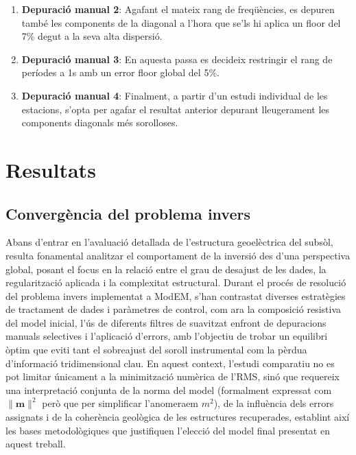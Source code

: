 \documentclass[11pt,a4paper,oneside]{article}
\begin{document}
\begin{enumerate}
    
    \item \textbf{Depuració manual 2}: Agafant el mateix rang de freqüències, es depuren també les components de la diagonal a l'hora que se'ls hi aplica un floor del 7\% degut a la seva alta dispersió.
    
    \item \textbf{Depuració manual 3}: En aquesta passa es decideix restringir el rang de períodes a 1s amb un error floor global del 5\%.

    \item \textbf{Depuració manual 4}: Finalment, a partir d'un estudi individual de les estacions, s'opta per agafar el resultat anterior depurant lleugerament les components diagonals més sorolloses.    

\end{enumerate} 


\section{Resultats}

\subsection{Convergència del problema invers}


Abans d'entrar en l'avaluació detallada de l'estructura geoelèctrica del subsòl,
resulta fonamental analitzar el comportament de la inversió des d'una perspectiva
global, posant el focus en la relació entre el grau de desajust de les dades, la
regularització aplicada i la complexitat estructural.
Durant el procés de resolució del problema invers
implementat a ModEM, s'han contrastat diverses estratègies de tractament de dades i
paràmetres de control, com ara la composició resistiva del model inicial, l'ús de diferents filtres de suavitzat enfront de
depuracions manuals selectives i l'aplicació d'errors, amb l'objectiu de trobar un equilibri òptim que eviti
tant el sobreajust del soroll instrumental com la pèrdua d'informació tridimensional
clau. En aquest context, l'estudi comparatiu no es pot limitar únicament a la
minimització numèrica de l'RMS, sinó que requereix una interpretació conjunta de la
norma del model (formalment expressat com $\|\mathbf{m}\|^2$ però que per simplificar l'anomeraem $m^2$), de la influència dels errors assignats i de la coherència geològica
de les estructures recuperades, establint així les bases metodològiques que
justifiquen l'elecció del model final presentat en aquest treball.
\end{document}
